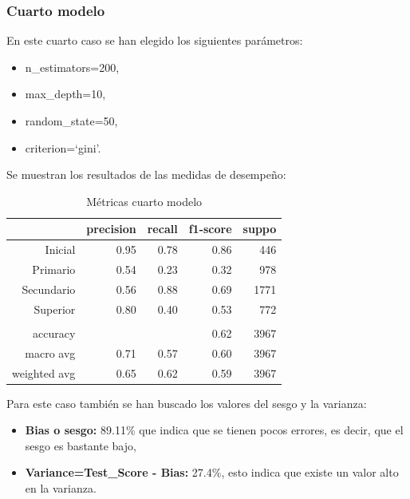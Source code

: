 \documentclass[a4paper]{article}
\begin{document}
        \subsubsection{Cuarto modelo}

            En este cuarto caso se han elegido los siguientes parámetros:
            \begin{itemize}
                \item n\_estimators=200,
                \item max\_depth=10,
                \item random\_state=50,
                \item criterion=`gini'.
            \end{itemize}

            Se muestran los resultados de las medidas de desempeño:
            \begin{table}[H]
                \centering
                \begin{tabular}{rrrrr}
                    \toprule
                    ~ & precision & recall & f1-score & suppo \\ \midrule
                    Inicial    & 0.95 & 0.78 & 0.86 & 446 \\
                    Primario   & 0.54 & 0.23 & 0.32 & 978 \\
                    Secundario & 0.56 & 0.88 & 0.69 & 1771 \\
                    Superior   & 0.80 & 0.40 & 0.53 & 772 \\
                    & & & & \\
                    accuracy & & & 0.62 & 3967 \\
                    macro avg & 0.71 & 0.57 & 0.60 & 3967 \\
                    weighted avg & 0.65 & 0.62 & 0.59 & 3967 \\
                    \bottomrule
                \end{tabular}
                \caption{Métricas cuarto modelo}
                \label{Fourth model metrics}
            \end{table}

            Para este caso también se han buscado los valores del sesgo y la varianza:
            \begin{itemize}
                \item \textbf{Bias o sesgo:} 89.11\% que indica que se tienen pocos errores, es decir, que el sesgo es bastante bajo,
                \item \textbf{Variance=Test\_Score - Bias:} 27.4\%, esto indica que existe un valor alto en la varianza.
             \end{itemize}
\end{document}
